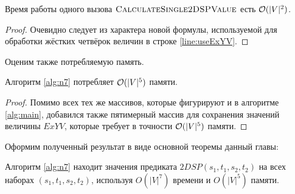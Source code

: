 \begin{proposition} \label{n7_rt2}
Время работы одного вызова $\textsc{CalculateSingle2DSPValue}$ есть $\mathcal{O}(|V|^2)$.
\end{proposition}
\begin{proof}
Очевидно следует из характера новой формулы, используемой для обработки жёстких четвёрок величин в строке \ref{line:useExYV}.
\end{proof}

Оценим также потребляемую память.

\begin{proposition} \label{n7_m}
Алгоритм \ref{alg:n7} потребляет $\mathcal{O}(|V|^5)$ памяти.
\end{proposition}
\begin{proof}
Помимо всех тех же массивов, которые фигурируют и в алгоритме \ref{alg:main}, добавился также пятимерный массив для сохранения значений величины $ExYV$, которые требует в точности $\mathcal{O}(|V|^5)$ памяти.
\end{proof}

Оформим полученный результат в виде основной теоремы данный главы:
\begin{theorem}
Алгоритм \ref{alg:n7} находит значения предиката $2DSP(s_1, t_1, s_2, t_2)$ на всех наборах $(s_1, t_1, s_2, t_2)$, используя $O(|V|^7)$ времени и $O(|V|^5)$ памяти. 
\end{theorem}


